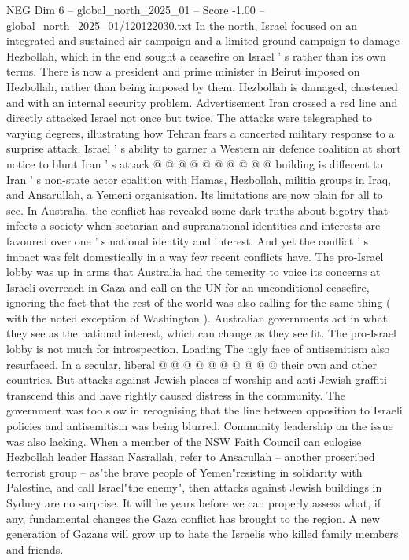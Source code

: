 \begin{textsample}{NEG Dim 6 – global\_north\_2025\_01 – Score -1.00 – global\_north\_2025\_01/120122030.txt}
In the north, Israel focused on an integrated and sustained air campaign and a limited ground campaign to damage Hezbollah, which in the end sought a ceasefire on Israel ' s rather than its own terms.
There is now a president and prime minister in Beirut imposed on Hezbollah, rather than being imposed by them.
Hezbollah is damaged, chastened and with an internal security problem.
Advertisement Iran crossed a red line and directly attacked Israel not once but twice.
The attacks were telegraphed to varying degrees, illustrating how Tehran fears a concerted military response to a surprise attack.
Israel ' s ability to garner a Western air defence coalition at short notice to blunt Iran ' s attack @ @ @ @ @ @ @ @ @ @ building is different to Iran ' s non-state actor coalition with Hamas, Hezbollah, militia groups in Iraq, and Ansarullah, a Yemeni organisation.
Its limitations are now plain for all to see.
In Australia, the conflict has revealed some dark truths about bigotry that infects a society when sectarian and supranational identities and interests are favoured over one ' s national identity and interest.
And yet the conflict ' s impact was felt domestically in a way few recent conflicts have.
The pro-Israel lobby was up in arms that Australia had the temerity to voice its concerns at Israeli overreach in Gaza and call on the UN for an unconditional ceasefire, ignoring the fact that the rest of the world was also calling for the same thing ( with the noted exception of Washington ).
Australian governments act in what they see as the national interest, which can change as they see fit.
The pro-Israel lobby is not much for introspection.
Loading The ugly face of antisemitism also resurfaced.
In a secular, liberal @ @ @ @ @ @ @ @ @ @ their own and other countries.
But attacks against Jewish places of worship and anti-Jewish graffiti transcend this and have rightly caused distress in the community.
The government was too slow in recognising that the line between opposition to Israeli policies and antisemitism was being blurred.
Community leadership on the issue was also lacking.
When a member of the NSW Faith Council can eulogise Hezbollah leader Hassan Nasrallah, refer to Ansarullah -- another proscribed terrorist group -- as"the brave people of Yemen"resisting in solidarity with Palestine, and call Israel"the enemy", then attacks against Jewish buildings in Sydney are no surprise.
It will be years before we can properly assess what, if any, fundamental changes the Gaza conflict has brought to the region.
A new generation of Gazans will grow up to hate the Israelis who killed family members and friends.

\end{textsample}
